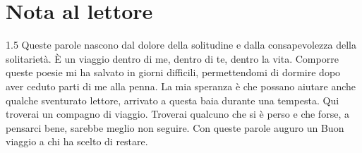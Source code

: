 \chapter*{Nota al lettore}

\begin{spacing}{1.5}
Queste parole nascono dal dolore della solitudine e dalla consapevolezza della solitarietà.\newline
È un viaggio dentro di me, dentro di te, dentro la vita. Comporre queste poesie mi ha salvato in giorni difficili, permettendomi di dormire dopo aver ceduto parti di me alla penna. La mia speranza è che possano aiutare anche qualche sventurato lettore, arrivato a questa baia durante una tempesta. Qui troverai un compagno di viaggio. Troverai qualcuno che si è perso e che forse, a pensarci bene, sarebbe meglio non seguire. Con queste parole auguro un Buon viaggio a chi ha scelto di restare.
\end{spacing}
